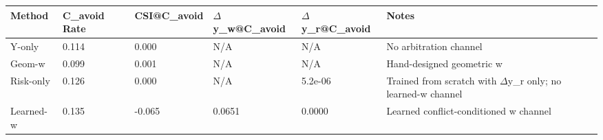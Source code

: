 \begin{tabular}{llllll}
\toprule
Method & C\_avoid Rate & CSI@C\_avoid & $\Delta$y\_w@C\_avoid & $\Delta$y\_r@C\_avoid & Notes \\
\midrule
Y-only & 0.114 & 0.000 & N/A & N/A & No arbitration channel \\
Geom-w & 0.099 & 0.001 & N/A & N/A & Hand-designed geometric w \\
Risk-only & 0.126 & 0.000 & N/A & 5.2e-06 & Trained from scratch with $\Delta$y\_r only; no learned-w channel \\
Learned-w & 0.135 & -0.065 & 0.0651 & 0.0000 & Learned conflict-conditioned w channel \\
\bottomrule
\end{tabular}
